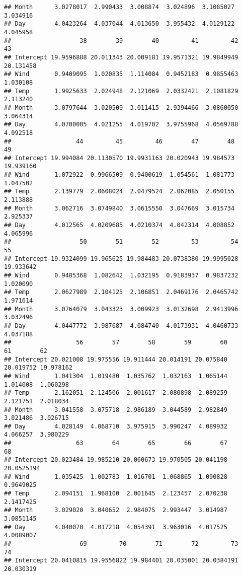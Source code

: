 \documentclass[
]{article}
\begin{document}
\begin{verbatim}
## Month      3.0278017  2.990433  3.008874  3.024896  3.1085027  3.034916
## Day        4.0423264  4.037044  4.013650  3.955432  4.0129122  4.045958
##                   38        39        40         41         42        43
## Intercept 19.9596888 20.011343 20.009181 19.9571321 19.9849949 20.131458
## Wind       0.9409095  1.020835  1.114084  0.9452183  0.9855463  1.030108
## Temp       1.9925633  2.024948  2.121069  2.0332421  2.1081829  2.113240
## Month      3.0797644  3.020509  3.011415  2.9394466  3.0860050  3.064314
## Day        4.0700005  4.021255  4.019702  3.9755968  4.0569788  4.092518
##                  44         45         46        47        48        49
## Intercept 19.994084 20.1130570 19.9931163 20.020943 19.984573 19.939160
## Wind       1.072922  0.9966509  0.9400619  1.054561  1.081773  1.047502
## Temp       2.139779  2.0608024  2.0479524  2.062085  2.050155  2.113888
## Month      3.062716  3.0749840  3.0615550  3.047669  3.015734  2.925337
## Day        4.012565  4.0209685  4.0210374  4.042314  4.008852  4.065996
##                   50        51        52         53         54        55
## Intercept 19.9324099 19.965625 19.984483 20.0738380 19.9995028 19.933642
## Wind       0.9485368  1.082642  1.032195  0.9183937  0.9837232  1.020090
## Temp       2.0627989  2.104125  2.106851  2.0469176  2.0465742  1.971614
## Month      3.0764079  3.043323  3.009923  3.0132698  2.9413996  3.032496
## Day        4.0447772  3.987687  4.084740  4.0173931  4.0460733  4.037188
##                  56        57        58        59        60        61        62
## Intercept 20.021008 19.975556 19.911444 20.014191 20.075840 20.019752 19.978162
## Wind       1.041304  1.019480  1.035762  1.032163  1.065144  1.014008  1.060298
## Temp       2.162051  2.124506  2.001617  2.080898  2.089259  2.121751  2.018034
## Month      3.041558  3.075718  2.986189  3.044589  2.982849  3.021486  3.026715
## Day        4.028149  4.068710  3.975915  3.990247  4.089932  4.066257  3.980229
##                  63        64        65        66        67         68
## Intercept 20.023484 19.985210 20.060673 19.970505 20.041198 20.0525194
## Wind       1.035425  1.002783  1.016701  1.068865  1.090828  0.9649025
## Temp       2.094151  1.968100  2.001645  2.123457  2.070238  2.1417425
## Month      3.029020  3.040652  2.984075  2.993447  3.014987  3.0851145
## Day        4.040070  4.017218  4.054391  3.963016  4.017525  4.0089007
##                   69         70        71        72         73        74
## Intercept 20.0410815 19.9556822 19.984401 20.035001 20.0384191 20.030319

\end{verbatim}
\end{document}
